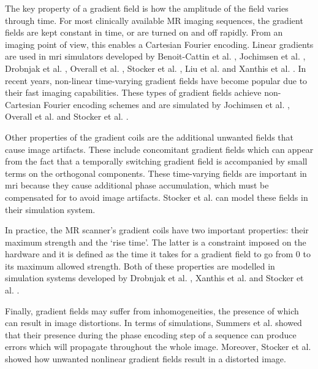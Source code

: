 \hfill
    
The key property of a gradient field is how the amplitude of the field varies through time.
For most clinically available MR imaging sequences, the gradient fields are kept constant in time, or are turned on and off rapidly.
From an imaging point of view, this enables a Cartesian Fourier encoding.
Linear gradients are used in \ac{mri} simulators developed by
Benoit-Cattin et al. \cite{Benoit-Cattin2005},
Jochimsen et al. \cite{Jochimsen2004},
Drobnjak et al. \cite{Drobnjak2006},
Overall et al. \cite{Overall2007},
Stocker et al. \cite{Stocker2010},
Liu et al. \cite{Liu2013} and 
Xanthis et al. \cite{Xanthis2014}.
In recent years, non-linear time-varying gradient fields have become popular due to their fast imaging capabilities.
These types of gradient fields achieve non-Cartesian Fourier encoding schemes and are simulated by 
Jochimsen et al. \cite{Jochimsen2004}, 
Overall et al. \cite{Overall2007} and
Stocker et al. \cite{Stocker2010}.

\hfill

Other properties of the gradient coils are the additional unwanted fields that cause image artifacts.
These include concomitant gradient fields which can appear from the fact that a temporally switching gradient field is accompanied by small terms on the orthogonal components.
These time-varying fields are important in \ac{mri} because they cause additional phase accumulation, which must be compensated for to avoid image artifacts.
Stocker et al. \cite{Stocker2010} can model these fields in their simulation system.

\hfill

In practice, the MR scanner's gradient coils have two important properties: their maximum strength and the `rise time'.
The latter is a constraint imposed on the hardware and it is defined as the time it takes for a gradient field to go from 0 to its maximum allowed strength.
Both of these properties are modelled in simulation systems developed by Drobnjak et al. \cite{Drobnjak2006}, Xanthis et al. \cite{Xanthis2014} and Stocker et al. \cite{Stocker2010}.

\hfill

Finally, gradient fields may suffer from inhomogeneities, the presence of which can result in image distortions.
In terms of simulations, Summers et al. \cite{Summers1986} showed that their presence during the phase encoding step of a sequence can produce errors which will propagate throughout the whole image.
Moreover, Stocker et al. \cite{Stocker2010} showed how unwanted nonlinear gradient fields result in a distorted image.

